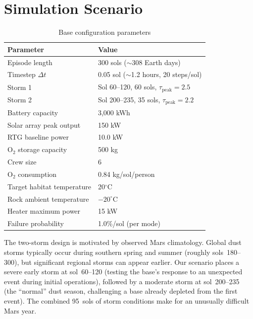 \documentclass[11pt,a4paper]{article}
\begin{document}
\section{Simulation Scenario}

\begin{table}[H]
  \centering
  \caption{Base configuration parameters}
  \label{tab:scenario}
  \begin{tabular}{@{}ll@{}}
    \toprule
    \textbf{Parameter} & \textbf{Value} \\
    \midrule
    Episode length & 300 sols ($\sim$308 Earth days) \\
    Timestep $\Delta t$ & 0.05 sol ($\sim$1.2 hours, 20 steps/sol) \\
    Storm 1 & Sol 60--120, 60 sols, $\tau_{\text{peak}} = 2.5$ \\
    Storm 2 & Sol 200--235, 35 sols, $\tau_{\text{peak}} = 2.2$ \\
    Battery capacity & 3,000 kWh \\
    Solar array peak output & 150 kW \\
    RTG baseline power & 10.0 kW \\
    O$_2$ storage capacity & 500 kg \\
    Crew size & 6 \\
    O$_2$ consumption & 0.84 kg/sol/person \\
    Target habitat temperature & 20$^\circ$C \\
    Rock ambient temperature & $-20^\circ$C \\
    Heater maximum power & 15 kW \\
    Failure probability & 1.0\%/sol (per mode) \\
    \bottomrule
  \end{tabular}
\end{table}

The two-storm design is motivated by observed Mars climatology. Global dust storms typically occur during southern spring and summer (roughly sols~180--300), but significant regional storms can appear earlier. Our scenario places a severe early storm at sol~60--120 (testing the base's response to an unexpected event during initial operations), followed by a moderate storm at sol~200--235 (the ``normal'' dust season, challenging a base already depleted from the first event). The combined 95~sols of storm conditions make for an unusually difficult Mars year.
\end{document}
